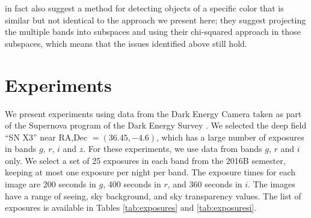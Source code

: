 \documentclass[11pt,letterpaper,linenumbers]{aastex63}
\begin{document}
\cite{szalay1999} in fact also suggest a method for detecting objects
of a specific color that is similar but not identical to the approach
we present here; they suggest projecting the multiple bands into
subspaces and using their chi-squared approach in those subspaces,
which means that the issues identified above still hold.



\section{Experiments}



We present experiments using data from the Dark Energy Camera
\citep{decam} taken as part of the Supernova program \citep{dessn} of
the Dark Energy Survey \citep{des}.  We selected the deep field ``SN
X3'' near RA,Dec $= (36.45, -4.6)$, which has a large number of
exposures in bands $g$, $r$, $i$ and $z$.  For these experiments, we
use data from bands $g$, $r$ and $i$ only.  We select a set of 25
exposures in each band from the 2016B semester, keeping at most one
exposure per night per band.  The exposure times for each image are
200 seconds in $g$, 400 seconds in $r$, and 360 seconds in $i$.  The
images have a range of seeing, sky background, and sky transparency
values.  The list of exposures is available in Tables
\ref{tab:exposures} and \ref{tab:exposuresi}.
\end{document}
